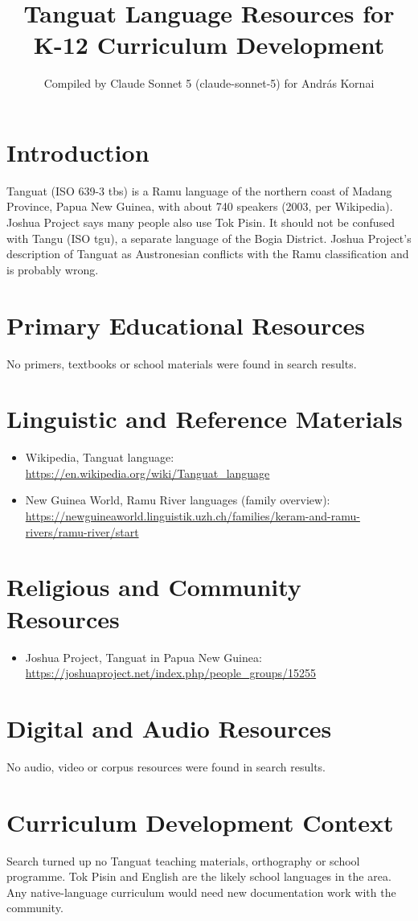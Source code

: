 \documentclass[12pt]{article}
\title{Tanguat Language Resources for K-12 Curriculum Development}
\author{Compiled by Claude Sonnet 5 (claude-sonnet-5) for Andr\'as Kornai}
\date{}
\begin{document}
\maketitle

\section{Introduction}
Tanguat (ISO 639-3 tbs) is a Ramu language of the northern coast of Madang Province, Papua New Guinea, with about 740 speakers (2003, per Wikipedia). Joshua Project says many people also use Tok Pisin. It should not be confused with Tangu (ISO tgu), a separate language of the Bogia District. Joshua Project's description of Tanguat as Austronesian conflicts with the Ramu classification and is probably wrong.

\section{Primary Educational Resources}
No primers, textbooks or school materials were found in search results.

\section{Linguistic and Reference Materials}
\begin{itemize}
\item Wikipedia, Tanguat language: \url{https://en.wikipedia.org/wiki/Tanguat_language}
\item New Guinea World, Ramu River languages (family overview): \url{https://newguineaworld.linguistik.uzh.ch/families/keram-and-ramu-rivers/ramu-river/start}
\end{itemize}

\section{Religious and Community Resources}
\begin{itemize}
\item Joshua Project, Tanguat in Papua New Guinea: \url{https://joshuaproject.net/index.php/people_groups/15255}
\end{itemize}

\section{Digital and Audio Resources}
No audio, video or corpus resources were found in search results.

\section{Curriculum Development Context}
Search turned up no Tanguat teaching materials, orthography or school programme. Tok Pisin and English are the likely school languages in the area. Any native-language curriculum would need new documentation work with the community.
\end{document}

